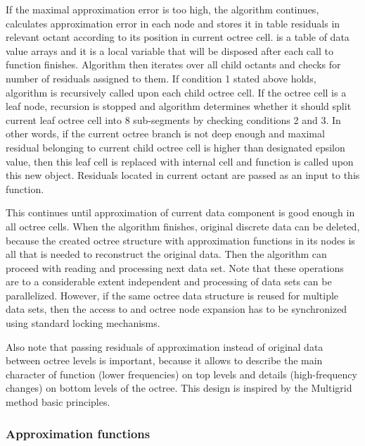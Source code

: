 If the maximal approximation error is too high, the algorithm continues, calculates approximation error in each node and stores it in table residuals in relevant octant according to its position in current octree cell.  is a table of data value arrays and it is a local variable that will be disposed after each call to function  finishes. Algorithm then iterates over all child octants and checks for number of residuals assigned to them. If condition 1 stated above holds, algorithm is recursively called upon each child octree cell. If the octree cell is a leaf node, recursion is stopped and algorithm determines whether it should split current leaf octree cell into 8 sub-segments by checking conditions 2 and 3. In other words, if the current octree branch is not deep enough and maximal residual belonging to current child octree cell is higher than designated epsilon value, then this leaf cell is replaced with internal cell and function  is called upon this new  object. Residuals located in current octant are passed as an input to this function.

This continues until approximation of current data component is good enough in all octree cells.  When the algorithm finishes, original discrete data can be deleted, because the created octree structure with approximation functions in its nodes is all that is needed to reconstruct the original data. Then the algorithm can proceed with reading and processing next data set. Note that these operations are to a considerable extent independent and processing of data sets can be parallelized. However, if the same octree data structure is reused for multiple data sets, then the access to  and octree node expansion has to be synchronized using standard locking mechanisms.

Also note that passing residuals of approximation instead of original data between octree levels is important, because it allows to describe the main character of function (lower frequencies) on top levels and details (high-frequency changes) on bottom levels of the octree. This design is inspired by the Multigrid method basic principles.


\subsubsection{Approximation functions}

